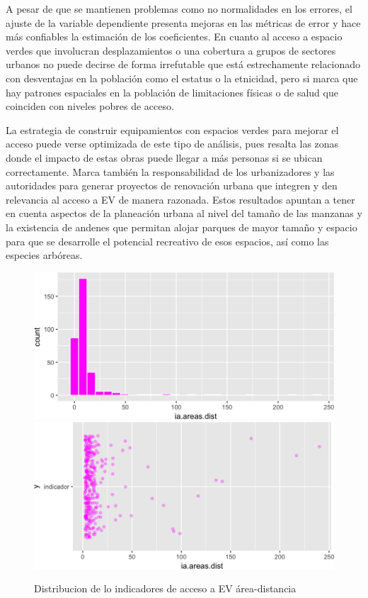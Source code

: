 \documentclass[12pt,]{book}
\begin{document}
A pesar de que se mantienen problemas como no normalidades en los
errores, el ajuste de la variable dependiente presenta mejoras en las
métricas de error y hace más confiables la estimación de los
coeficientes. En cuanto al acceso a espacio verdes que involucran
desplazamientos o una cobertura a grupos de sectores urbanos no puede
decirse de forma irrefutable que está estrechamente relacionado con
desventajas en la población como el estatus o la etnicidad, pero si
marca que hay patrones espaciales en la población de limitaciones
físicas o de salud que coinciden con niveles pobres de acceso.

La estrategia de construir equipamientos con espacios verdes para
mejorar el acceso puede verse optimizada de este tipo de análisis, pues
resalta las zonas donde el impacto de estas obras puede llegar a más
personas si se ubican correctamente. Marca también la responsabilidad de
los urbanizadores y las autoridades para generar proyectos de renovación
urbana que integren y den relevancia al acceso a EV de manera razonada.
Estos resultados apuntan a tener en cuenta aspectos de la planeación
urbana al nivel del tamaño de las manzanas y la existencia de andenes
que permitan alojar parques de mayor tamaño y espacio para que se
desarrolle el potencial recreativo de esos espacios, así como las
especies arbóreas.

\begin{figure}
\includegraphics[width=1\linewidth]{tesis-unigis_files/figure-latex/hist-areasdist-1} \includegraphics[width=1\linewidth]{tesis-unigis_files/figure-latex/hist-areasdist-2} \caption{Distribucion de lo indicadores de acceso a EV área-distancia }\label{fig:hist-areasdist}
\end{figure}
\end{document}
